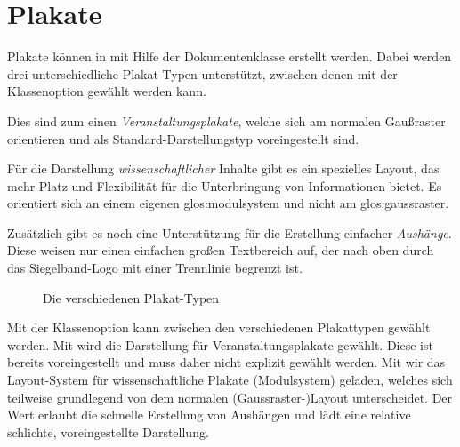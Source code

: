 \chapter{Plakate}

Plakate können in \tubslatex mit Hilfe der Dokumentenklasse  erstellt werden.
Dabei werden drei unterschiedliche Plakat-Typen unterstützt,
zwischen denen mit der Klassenoption  gewählt werden kann.

Dies sind zum einen \emph{Veranstaltungsplakate},
welche sich am normalen Gaußraster
orientieren und als Standard-Darstellungstyp voreingestellt sind.

Für die Darstellung \emph{wissenschaftlicher} Inhalte gibt es ein spezielles Layout,
das mehr Platz und Flexibilität für die Unterbringung von Informationen bietet.
Es orientiert sich an einem eigenen \gls{glos:modulsystem} und nicht am
\gls{glos:gaussraster}.

Zusätzlich gibt es noch eine Unterstützung für die Erstellung einfacher
\emph{Aushänge}. Diese weisen nur einen einfachen großen Textbereich auf, der
nach oben durch das Siegelband-Logo mit einer Trennlinie begrenzt ist.

\begin{figure}[htp]\centering
{}
\begin{minipage}{0.32\textwidth}\centering
\end{minipage}
\begin{minipage}{0.32\textwidth}\centering
\end{minipage}
\begin{minipage}{0.32\textwidth}\centering
\end{minipage}
\caption{Die verschiedenen Plakat-Typen}
\end{figure}

\begin{Declaration}
\end{Declaration}

Mit der Klassenoption  kann zwischen
den verschiedenen Plakattypen gewählt werden.
Mit  wird die Darstellung für Veranstaltungsplakate
gewählt. Diese ist bereits voreingestellt und muss daher nicht explizit gewählt
werden.
Mit  wir das Layout-System für wissenschaftliche Plakate
(Modulsystem) geladen, welches sich teilweise grundlegend von
dem normalen (Gaussraster-)Layout unterscheidet.
Der Wert  erlaubt die schnelle Erstellung von
Aushängen und lädt eine relative schlichte, voreingestellte Darstellung.

